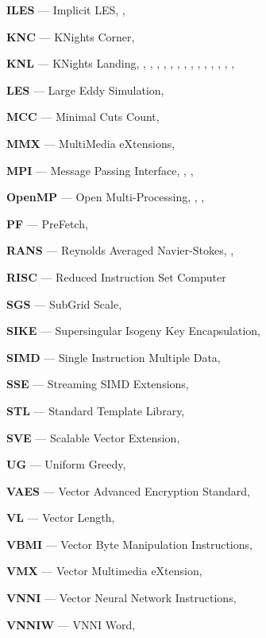 \textbf{ILES} --- Implicit LES, \pageref{abbr:iles}, \pageref{abbr:iles2}

\textbf{KNC} --- KNights Corner, \pageref{abbr:knc}

\textbf{KNL} --- KNights Landing, \pageref{abbr:knl}, \pageref{abbr:knl2}, \pageref{abbr:knl3}, \pageref{abbr:knl4}, \pageref{abbr:knl5}, \pageref{abbr:knl6}, \pageref{abbr:knl7}, \pageref{abbr:knl8}, \pageref{abbr:knl9}, \pageref{abbr:knl10}, \pageref{abbr:knl11}, \pageref{abbr:knl12}, \pageref{abbr:knl13}, \pageref{abbr:knl14}, \pageref{abbr:knl15}

\textbf{LES} --- Large Eddy Simulation, \pageref{abbr:les}

\textbf{MCC} --- Minimal Cuts Count, \pageref{abbr:mcc}

\textbf{MMX} --- MultiMedia eXtensions, \pageref{abbr:mmx}

\textbf{MPI} --- Message Passing Interface, \pageref{abbr:mpi}, \pageref{abbr:mpi2}, \pageref{abbr:mpi3}

\textbf{OpenMP} --- Open Multi-Processing, \pageref{abbr:openmp}, \pageref{abbr:openmp2}, \pageref{abbr:openmp3}

\textbf{PF} --- PreFetch, \pageref{abbr:pf}

\textbf{RANS} --- Reynolds Averaged Navier-Stokes, \pageref{abbr:rans}, \pageref{abbr:rans2}

\textbf{RISC} --- Reduced Instruction Set Computer

\textbf{SGS} --- SubGrid Scale, \pageref{abbr:sgs}

\textbf{SIKE} --- Supersingular Isogeny Key Encapsulation, \pageref{abbr:sike}

\textbf{SIMD} --- Single Instruction Multiple Data, \pageref{abbr:simd}

\textbf{SSE} --- Streaming SIMD Extensions, \pageref{abbr:sse}

\textbf{STL} --- Standard Template Library, \pageref{abbr:stl}

\textbf{SVE} --- Scalable Vector Extension, \pageref{abbr:sve}

\textbf{UG} --- Uniform Greedy, \pageref{abbr:ug}

\textbf{VAES} --- Vector Advanced Encryption Standard, \pageref{abbr:vaes}

\textbf{VL} --- Vector Length, \pageref{abbr:vl}

\textbf{VBMI} --- Vector Byte Manipulation Instructions, \pageref{abbr:vbmi}

\textbf{VMX} --- Vector Multimedia eXtension, \pageref{abbr:vmx}

\textbf{VNNI} --- Vector Neural Network Instructions, \pageref{abbr:vnni}

\textbf{VNNIW} --- VNNI Word, \pageref{abbr:vnniw}
